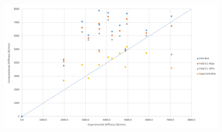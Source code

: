 \documentclass[11pt,a4paper]{article}
\begin{document}
\begin{figure}[ht!]
\centering
\includegraphics[width=15cm]{images/plot_comp_vs.png}
\end{figure}
\end{document}
